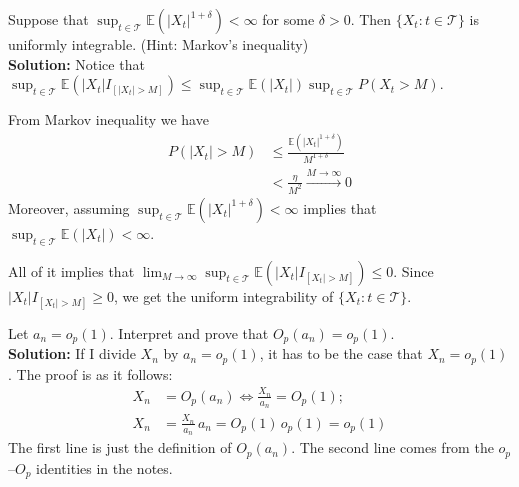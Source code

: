 \documentclass[11pt,letterpaper]{article}                  %
\begin{document}
\begin{problem}
Suppose that $\sup_{t \in \mathcal{T}} \mathbb{E}(|X_t|^{1+\delta}) < \infty$ for some $\delta >0$. Then $\{X_t : t \in \mathcal{T}\}$ is uniformly integrable. (Hint: Markov's inequality) \\

\textbf{Solution:} Notice that $\sup_{t \in \mathcal{T}} \mathbb{E}(|X_t|I_{[|X_t|>M]}) \leq \sup_{t \in \mathcal{T}} \mathbb{E}(|X_t|) \sup_{t \in \mathcal{T}}P(X_t >M)$.

From Markov inequality we have
\begin{align*}
P(|X_t|>M)&\leq \frac{\mathbb{E}(|X_t|^{1+\delta})}{M^{1+\delta}} \\
&< \frac{\eta}{M^2} \overset{M \to \infty}{\longrightarrow} 0
\end{align*}
Moreover, assuming $\sup_{t \in \mathcal{T}} \mathbb{E}(|X_t|^{1+\delta}) < \infty$ implies that $\sup_{t \in \mathcal{T}} \mathbb{E}(|X_t|)<\infty$.

All of it implies that $\lim_{M \to \infty} \sup_{t \in \mathcal{T}} \mathbb{E}(|X_t| I_{[X_t| > M]}) \leq 0$. Since $|X_t| I_{[X_t| > M]}\geq 0$, we get the uniform integrability of $\{X_t : t \in \mathcal{T}\}$.
\end{problem}

\bigskip

\begin{problem}

\end{problem}

\bigskip

\begin{problem}

\end{problem}

\bigskip

\begin{problem}

\end{problem}

\bigskip

\begin{problem}

\end{problem}

\bigskip

\begin{problem}
Let $a_n = o_p(1)$.
Interpret and prove that $O_p(a_n) = o_p(1)$. \\

\textbf{Solution:} If I divide $X_n$ by $a_n = o_p(1)$, it has to be the case that $X_n  = o_p(1)$.
The proof is as it follows:
\begin{align*}
  X_n &= O_p (a_n) \iff \frac{X_n}{a_n} = O_p(1); \\
  X_n &= \frac{X_n}{a_n} \, a_n = O_p(1) \, o_p(1) = o_p(1)
\end{align*}
The first line is just the definition of $O_p(a_n)$.
The second line comes from the $o_p$--$O_p$ identities in the notes.
\end{problem}
\end{document}
